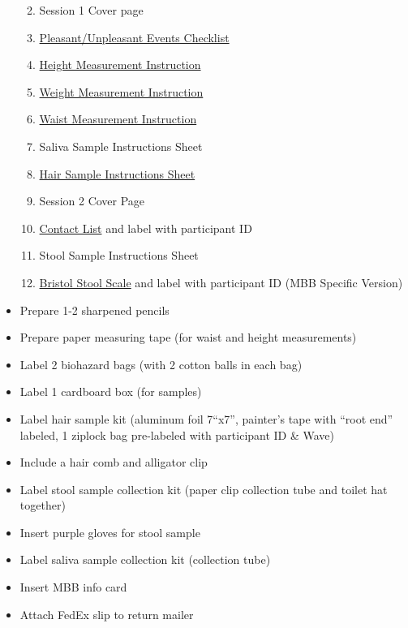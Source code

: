 \documentclass[
]{book}
\providecommand{\tightlist}{%
  \setlength{\itemsep}{0pt}\setlength{\parskip}{0pt}}
\begin{document}
\begin{itemize}
  \begin{enumerate}
  \def\labelenumi{\arabic{enumi}.}
  \tightlist
  \item
    Session 1 Cover page
  \item
    \href{https://ucla.app.box.com/file/630327764749}{Pleasant/Unpleasant Events Checklist}
  \item
    \href{https://ucla.app.box.com/file/698389151155}{Height Measurement Instruction}
  \item
    \href{https://ucla.app.box.com/file/698395394087}{Weight Measurement Instruction}
  \item
    \href{https://ucla.app.box.com/file/698395657078}{Waist Measurement Instruction}
  \item
    Saliva Sample Instructions Sheet
  \item
    \href{https://ucla.app.box.com/file/685938821891}{Hair Sample Instructions Sheet}
  \item
    Session 2 Cover Page
  \item
    \href{https://ucla.app.box.com/file/639652767665}{Contact List} and label with participant ID
  \item
    Stool Sample Instructions Sheet
  \item
    \href{https://app.box.com/file/630326499609}{Bristol Stool Scale} and label with participant ID (MBB Specific Version)
  \end{enumerate}
\item
  Prepare 1-2 sharpened pencils
\item
  Prepare paper measuring tape (for waist and height measurements)
\item
  Label 2 biohazard bags (with 2 cotton balls in each bag)
\item
  Label 1 cardboard box (for samples)
\item
  Label hair sample kit (aluminum foil 7``x7'', painter's tape with ``root end'' labeled, 1 ziplock bag pre-labeled with participant ID \& Wave)
\item
  Include a hair comb and alligator clip
\item
  Label stool sample collection kit (paper clip collection tube and toilet hat together)
\item
  Insert purple gloves for stool sample
\item
  Label saliva sample collection kit (collection tube)
\item
  Insert MBB info card
\item
  Attach FedEx slip to return mailer

\end{itemize}
\end{document}
